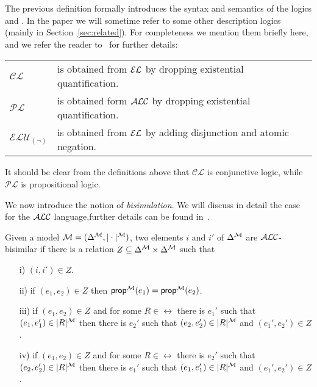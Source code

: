 The previous definition formally introduces the syntax and semantics of the
logics \alc and \el.  In the paper we will sometime refer to some other description logics (mainly in Section~\ref{sec:related}).  For completeness we mention them briefly here,
and we refer the reader to~\cite{baad:desc03} for further details:

\begin{center}
\begin{tabular}{lp{5.9cm}}
$\mathcal{CL}$ & is obtained from $\mathcal{EL}$ by dropping existential quantification.\\
$\mathcal{PL}$ & is obtained form $\mathcal{ALC}$ by dropping existential quantification.\\
$\mathcal{ELU}_{(\neg)}$ & is obtained from $\mathcal{EL}$ by adding disjunction and atomic negation.
\end{tabular}
\end{center}

\noindent
It should be clear from the definitions above that $\mathcal{CL}$ is conjunctive logic, while $\mathcal{PL}$ is propositional logic.

We now introduce the notion of \emph{bisimulation}.  We will discuss in detail
the case for the $\mathcal{ALC}$ language,further details can be found
in~\cite{blac:moda01,kurt:expr99}.

\begin{definition}
Given a model $\mathcal{M} = (\Delta^{\mathcal{M}},|\cdot|^{\mathcal{M}})$, two elements $i$ and $i'$ of $\Delta^{\mathcal{M}}$ are $\mathcal{ALC}$-bisimilar if there is a relation $Z \subseteq \Delta^{\mathcal{M}} \times \Delta^{\mathcal{M}}$ such that
\begin{itemize}
\item[i)] $(i,i') \in Z$.\\[-1.5em]
\item[ii)] if $(e_1, e_2) \in Z$ then $\textsf{prop}^{\mathcal{M}}(e_1) = \textsf{prop}^{\mathcal{M}}(e_2)$.\\[-1.5em]
\item[iii)] if $(e_1,e_2) \in Z$ and for some $R \in \rel$ there is $e_1'$ such that
$(e_1,e_1') \in |R|^{\mathcal{M}}$ then there is $e_2'$ such that $(e_2,e_2') \in |R|^{\mathcal{M}}$ and
$(e_1',e_2') \in Z$.\\[-1.5em]
\item[iv)] if $(e_1,e_2) \in Z$ and for some $R \in \rel$ there is $e_2'$ such that
$(e_2,e_2') \in |R|^{\mathcal{M}}$ then there is $e_1'$ such that $(e_1,e_1') \in |R|^{\mathcal{M}}$ and
$(e_1',e_2') \in Z$.
\end{itemize}
\end{definition}

